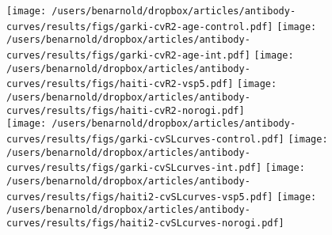 \documentclass[11pt]{article}
\begin{document}
\clearpage
\begin{landscape}

\begin{figure}[htbp]
\begin{center}
\texttt{[image: /users/benarnold/dropbox/articles/antibody-curves/results/figs/garki-cvR2-age-control.pdf]}
\texttt{[image: /users/benarnold/dropbox/articles/antibody-curves/results/figs/garki-cvR2-age-int.pdf]}
\texttt{[image: /users/benarnold/dropbox/articles/antibody-curves/results/figs/haiti-cvR2-vsp5.pdf]}
\texttt{[image: /users/benarnold/dropbox/articles/antibody-curves/results/figs/haiti-cvR2-norogi.pdf]}\\

\vspace{20pt}
\texttt{[image: /users/benarnold/dropbox/articles/antibody-curves/results/figs/garki-cvSLcurves-control.pdf]}
\texttt{[image: /users/benarnold/dropbox/articles/antibody-curves/results/figs/garki-cvSLcurves-int.pdf]}
\texttt{[image: /users/benarnold/dropbox/articles/antibody-curves/results/figs/haiti2-cvSLcurves-vsp5.pdf]}
\texttt{[image: /users/benarnold/dropbox/articles/antibody-curves/results/figs/haiti2-cvSLcurves-norogi.pdf]}


\end{center}
\end{figure}
\end{landscape}
\end{document}
